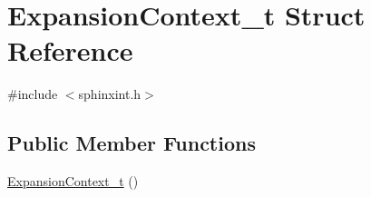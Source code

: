 \hypertarget{structExpansionContext__t}{\section{Expansion\-Context\-\_\-t Struct Reference}
\label{structExpansionContext__t}
}


{\ttfamily \#include $<$sphinxint.\-h$>$}

\subsection*{Public Member Functions}
\begin{DoxyCompactItemize}
\item 
\hyperlink{structExpansionContext__t_aca773661fd1f73aa9014ea1106ce6f72}{Expansion\-Context\-\_\-t} ()
\end{DoxyCompactItemize}

